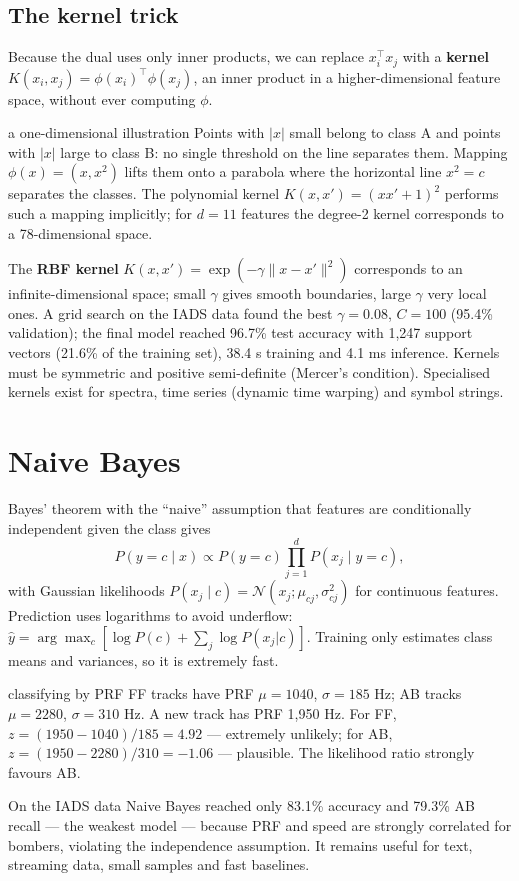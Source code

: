 \documentclass[11pt]{article}
\begin{document}
\subsection{The kernel trick}
Because the dual uses only inner products, we can replace $x_i^\top x_j$ with a \textbf{kernel} $K(x_i,x_j)=\phi(x_i)^\top\phi(x_j)$, an inner product in a higher-dimensional feature space, without ever computing $\phi$.
\begin{example}{a one-dimensional illustration}
Points with $|x|$ small belong to class A and points with $|x|$ large to class B: no single threshold on the line separates them. Mapping $\phi(x)=(x,x^2)$ lifts them onto a parabola where the horizontal line $x^2=c$ separates the classes. The polynomial kernel $K(x,x')=(xx'+1)^2$ performs such a mapping implicitly; for $d=11$ features the degree-2 kernel corresponds to a 78-dimensional space.
\end{example}
The \textbf{RBF kernel} $K(x,x')=\exp(-\gamma\|x-x'\|^2)$ corresponds to an infinite-dimensional space; small $\gamma$ gives smooth boundaries, large $\gamma$ very local ones. A grid search on the IADS data found the best $\gamma=0.08$, $C=100$ (95.4\% validation); the final model reached 96.7\% test accuracy with 1,247 support vectors (21.6\% of the training set), 38.4 s training and 4.1 ms inference. Kernels must be symmetric and positive semi-definite (Mercer's condition). Specialised kernels exist for spectra, time series (dynamic time warping) and symbol strings.

\section{Naive Bayes}
Bayes' theorem with the ``naive'' assumption that features are conditionally independent given the class gives
\[P(y=c\mid x)\propto P(y=c)\prod_{j=1}^dP(x_j\mid y=c),\]
with Gaussian likelihoods $P(x_j\mid c)=\mathcal N(x_j;\mu_{cj},\sigma_{cj}^2)$ for continuous features. Prediction uses logarithms to avoid underflow: $\hat y=\arg\max_c[\log P(c)+\sum_j\log P(x_j|c)]$. Training only estimates class means and variances, so it is extremely fast.
\begin{example}{classifying by PRF}
FF tracks have PRF $\mu=1040$, $\sigma=185$ Hz; AB tracks $\mu=2280$, $\sigma=310$ Hz. A new track has PRF 1,950 Hz. For FF, $z=(1950-1040)/185=4.92$ --- extremely unlikely; for AB, $z=(1950-2280)/310=-1.06$ --- plausible. The likelihood ratio strongly favours AB.
\end{example}
On the IADS data Naive Bayes reached only 83.1\% accuracy and 79.3\% AB recall --- the weakest model --- because PRF and speed are strongly correlated for bombers, violating the independence assumption. It remains useful for text, streaming data, small samples and fast baselines.
\end{document}
